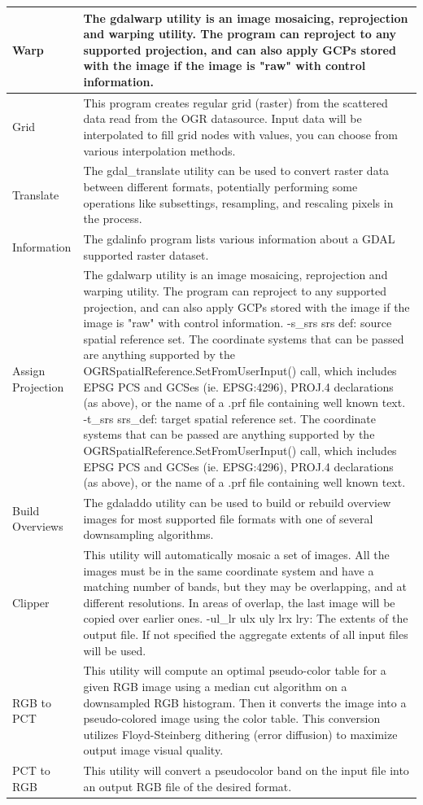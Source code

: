 {\begin{longtable}{|p{3cm}|p{13cm}|}
\hline Warp & The gdalwarp utility is an image mosaicing, reprojection and warping utility. The program can reproject to any supported projection, and can also apply GCPs stored with the image if the image is "raw" with control information. \\
\hline Grid & This program creates regular grid (raster) from the scattered data read from the OGR datasource. Input data will be interpolated to fill grid nodes with values, you can choose from various interpolation methods.\\
\hline Translate & The gdal\_translate utility can be used to convert raster data between different formats, potentially performing some operations like subsettings, resampling, and rescaling pixels in the process.\\
\hline Information & The gdalinfo program lists various information about a GDAL supported raster dataset. \\
\hline Assign Projection &  The gdalwarp utility is an image mosaicing, reprojection and warping utility. The program can reproject to any supported projection, and can also apply GCPs stored with the image if the image is "raw" with control information.
-s\_srs srs def:
source spatial reference set. The coordinate systems that can be passed are anything supported by the OGRSpatialReference.SetFromUserInput() call, which includes EPSG PCS and GCSes (ie. EPSG:4296), PROJ.4 declarations (as above), or the name of a .prf file containing well known text. 
-t\_srs srs\_def:
target spatial reference set. The coordinate systems that can be passed are anything supported by the OGRSpatialReference.SetFromUserInput() call, which includes EPSG PCS and GCSes (ie. EPSG:4296), PROJ.4 declarations (as above), or the name of a .prf file containing well known text. \\
\hline Build Overviews &  The gdaladdo utility can be used to build or rebuild overview images for most supported file formats with one of several downsampling algorithms.\\
\hline Clipper & This utility will automatically mosaic a set of images. All the images must be in the same coordinate system and have a matching number of bands, but they may be overlapping, and at different resolutions. In areas of overlap, the last image will be copied over earlier ones. 
-ul\_lr ulx uly lrx lry:
The extents of the output file. If not specified the aggregate extents of all input files will be used. \\
\hline RGB to PCT &  This utility will compute an optimal pseudo-color table for a given RGB image using a median cut algorithm on a downsampled RGB histogram. Then it converts the image into a pseudo-colored image using the color table. This conversion utilizes Floyd-Steinberg dithering (error diffusion) to maximize output image visual quality. \\
\hline PCT to RGB &  This utility will convert a pseudocolor band on the input file into an output RGB file of the desired format.\\
\hline
\end{longtable}

}
